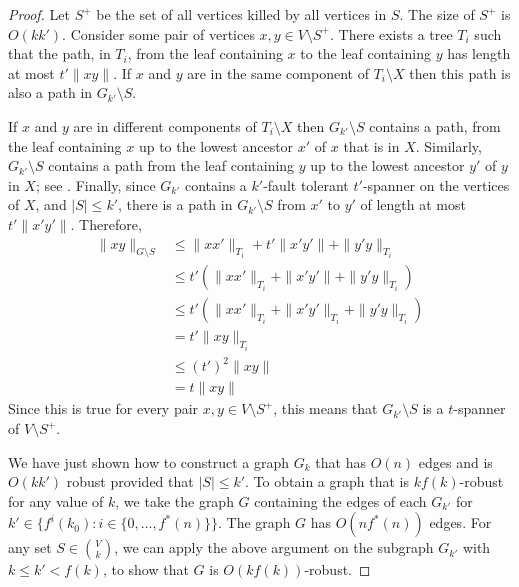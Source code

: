 \documentclass{cccg12}
\begin{document}
\begin{proof}
  Let $S^+$ be the set of all vertices killed by all vertices in $S$.
  The size of $S^+$ is $O(kk')$. Consider some pair of vertices $x,y\in
  V\setminus S^+$.  There exists a tree $T_i$ such that the path, in
  $T_i$, from the leaf containing $x$ to the leaf containing $y$ has
  length at most $t'\|xy\|$.  If $x$ and $y$ are in the same component of
  $T_i\setminus X$ then this path is also a path in $G_{k'}\setminus S$.

  If $x$ and $y$ are in different components of $T_i\setminus X$ then
  $G_{k'}\setminus S$ contains a path, from the leaf containing $x$
  up to the lowest ancestor $x'$ of $x$ that is in $X$.  Similarly,
  $G_{k'}\setminus S$ contains a path from the leaf containing $y$ up to
  the lowest ancestor $y'$ of $y$ in $X$; see .
  Finally, since $G_{k'}$ contains a $k'$-fault tolerant $t'$-spanner
  on the vertices of $X$, and $|S|\le k'$, there is a path in
  $G_{k'}\setminus S$ from $x'$ to $y'$ of length at most $t'\|x'y'\|$.
  Therefore,
  \begin{align*}
    \|xy\|_{G\setminus S} 
       & \le \|xx'\|_{T_i} + t'\|x'y'\| + \|y'y\|_{T_i} \\
       & \le t'(\|xx'\|_{T_i} + \|x'y'\| + \|y'y\|_{T_i}) \\
       & \le t'(\|xx'\|_{T_i} + \|x'y'\|_{T_i} + \|y'y\|_{T_i}) \\
       &  = t'\|xy\|_{T_i} \\
       & \le (t')^2\|xy\|  \\
       & = t\|xy\|
  \end{align*}
  Since this is true for every pair $x,y\in V\setminus S^+$, this means
  that $G_{k'}\setminus S$ is a $t$-spanner of $V\setminus S^+$.

  We have just shown how to construct a graph $G_k$ that has $O(n)$
  edges and is $O(kk')$ robust provided that $|S|\le k'$.  To obtain
  a graph that is $kf(k)$-robust for any value of $k$, we take the
  graph $G$ containing the edges of each $G_{k'}$ for $k'\in\{f^i(k_0) :
  i\in\{0,\ldots,f^*(n)\}\}$.  The graph $G$ has $O(nf^*(n))$ edges.
  For any set $S\in \binom{V}{k}$, we can apply the above argument
  on the subgraph $G_{k'}$ with $k \le k' < f(k)$, to show that $G$
  is $O(kf(k))$-robust.
\end{proof}
\end{document}
